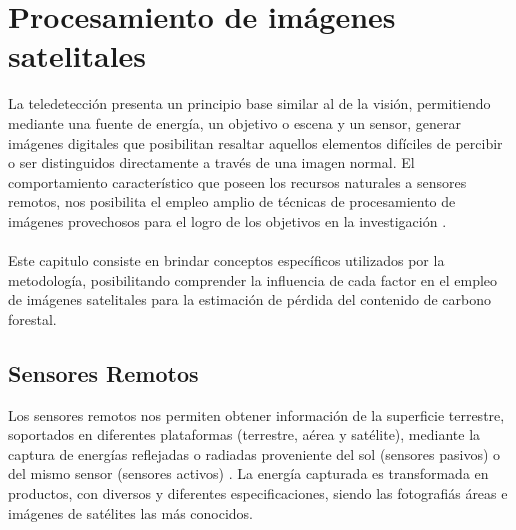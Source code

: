 
\newpage{\ } 
\thispagestyle{empty} 

\chapter{Procesamiento de im\'agenes satelitales}
La teledetecci\'on presenta un principio base similar al de la visi\'on, permitiendo mediante una fuente de energ\'ia, un objetivo o escena y un sensor, generar im\'agenes digitales que posibilitan resaltar aquellos elementos dif\'iciles de percibir o ser distinguidos directamente a trav\'es de una imagen normal. El comportamiento caracter\'istico que poseen los recursos naturales a sensores remotos, nos posibilita el empleo amplio de t\'ecnicas de procesamiento de im\'agenes provechosos para el logro de los objetivos en la investigaci\'on \cite{deespectro}. \\~\\
Este capitulo consiste en brindar conceptos espec\'ificos utilizados por la metodolog\'ia, posibilitando comprender la influencia de cada factor en el empleo de im\'agenes satelitales para la estimaci\'on de p\'erdida del contenido de carbono forestal.

\section{Sensores Remotos}
Los sensores remotos nos permiten obtener informaci\'on de la superficie terrestre, soportados en diferentes plataformas (terrestre, a\'erea y sat\'elite), mediante la captura de energ\'ias reflejadas o radiadas proveniente del sol (sensores pasivos) o del mismo sensor (sensores activos) \cite{gustavo2012deteccion}. La energ\'ia capturada es transformada en productos, con diversos y diferentes especificaciones, siendo las fotografi\'as \'areas e im\'agenes de sat\'elites las m\'as conocidos.
